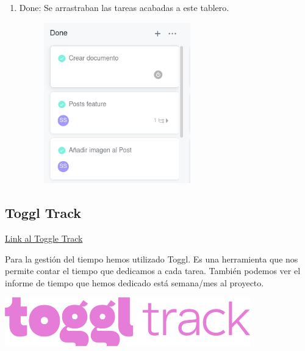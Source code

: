 \documentclass[12pt,a4paper]{article}
\begin{document}
\begin{enumerate}
\clearpage

\item Done: Se arrastraban las tareas acabadas a este tablero.

\begin{figure}[h]
	\centering
	\includegraphics[width=0.6\textwidth]{done}
\end{figure}


\end{enumerate}


\clearpage

\subsection{Toggl Track}
\href{https://track.toggl.com/5287323/projects/168929071/team}{Link al Toggle Track}\\


\begin{minipage}{.75\textwidth}
Para la gestión del tiempo hemos utilizado Toggl. Es una herramienta que nos permite contar el tiempo que dedicamos a cada tarea.
También podemos ver el informe de tiempo que hemos dedicado está semana/mes al proyecto. \\

\end{minipage} %
\begin{minipage}{.25\textwidth}
  \includegraphics[width=0.8\textwidth, right]{toggl}
\end{minipage}
\end{document}
